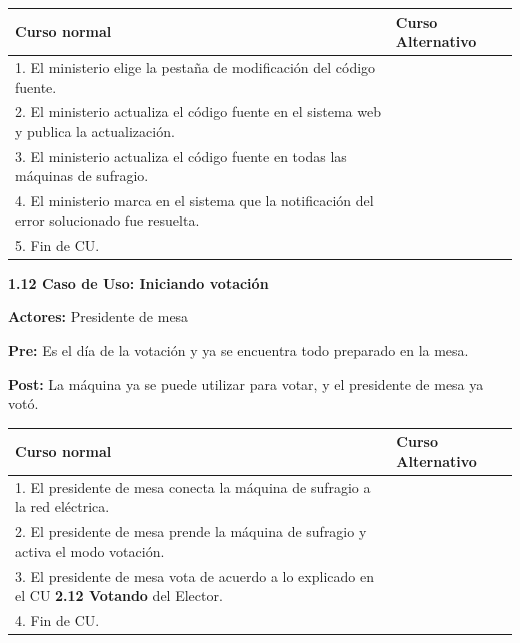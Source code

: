 \begin{table}[h!]
	
 \begin{tabular}{|p{7.5cm} | p{7.5cm}|} 
 \hline
 \textbf{Curso normal} & \textbf{Curso Alternativo} \\
 \hline



1. El ministerio elige la pestaña de modificación del código fuente. & \\
\hline

2. El ministerio actualiza el código fuente en el sistema web y publica la actualización. & \\
\hline

3. El ministerio actualiza el código fuente en todas las máquinas de sufragio. & \\
\hline


4. El ministerio marca en el sistema que la notificación del error solucionado fue resuelta. & \\
\hline

5. Fin de CU. & \\
\hline

\end{tabular}
\end{table}

\textbf{1.12 Caso de Uso: Iniciando votación}

\textbf{Actores:} Presidente de mesa

\textbf{Pre:} Es el día de la votación y ya se encuentra todo preparado en la mesa.

\textbf{Post:} La máquina ya se puede utilizar para votar, y el presidente de mesa ya votó.

\begin{table}[h!]
	
 \begin{tabular}{|p{7.5cm} | p{7.5cm}|} 
 \hline
 \textbf{Curso normal} & \textbf{Curso Alternativo} \\
 \hline

1. El presidente de mesa conecta la máquina de sufragio a la red eléctrica. & \\
\hline
2. El presidente de mesa prende la máquina de sufragio y activa el modo votación. & \\
\hline
3. El presidente de mesa vota de acuerdo a lo explicado en el CU \textbf{2.12 Votando} del Elector. & \\
\hline
4. Fin de CU.& \\
\hline



 \end{tabular}

\end{table}



